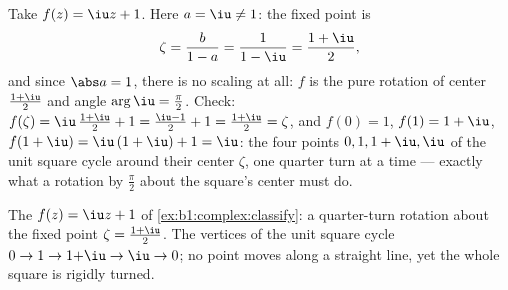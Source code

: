 \begin{example}\label{ex:b1:complex:classify}
Take $f(z) = \iu z + 1$. Here $a = \iu \neq 1$: the fixed point is
\[
\zeta = \frac{b}{1 - a} = \frac1{1 - \iu}
= \frac{1 + \iu}{2},
\]
and since $\abs a = 1$, there is no scaling at all: $f$ is the pure
rotation of center $\frac{1+\iu}2$ and angle $\arg \iu = \frac\pi2$.
Check: $f(\zeta) = \iu\,\frac{1+\iu}2 + 1 = \frac{\iu - 1}2 + 1 =
\frac{1 + \iu}2 = \zeta$, and $f(0) = 1$, $f(1) = 1 + \iu$, $f(1 +
\iu) = \iu\,(1 + \iu) + 1 = \iu$: the four points $0, 1, 1+\iu, \iu$
of the unit square cycle around their center $\zeta$, one quarter
turn at a time --- exactly what a rotation by $\frac\pi2$ about the
square's center must do.
\end{example}

\begin{omfigure}

{\small The  $f(z) = \iu z + 1$ of
\cref{ex:b1:complex:classify}: a quarter-turn rotation about the
fixed point $\zeta = \frac{1+\iu}2$. The vertices of the unit
square cycle $0 \to 1 \to 1{+}\iu \to \iu \to 0$; no point moves
along a straight line, yet the whole square is rigidly turned.}
\end{omfigure}

